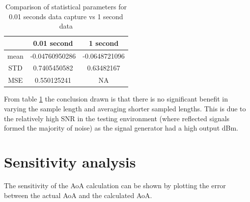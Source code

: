 \documentclass[class=report,11pt,crop=false]{standalone}
\begin{document}
\begin{table}[h]
    \centering
    \begin{tabular}{c|c|c}
         & \textbf{0.01 second } &\textbf{1 second} \\
         \hline
        mean & -0.04760950286 & -0.0648721096\\
        STD & 0.7405450582 & 0.63482167\\
        MSE & 0.550125241 & NA \\
    \end{tabular}
    \caption{Comparison of statistical parameters for 0.01 seconds data capture vs 1 second data}
    \label{tab:varied-length}
\end{table}

From table \ref{tab:varied-length} the conclusion drawn is that there is no significant benefit in varying the sample length and averaging shorter sampled lengths. This is due to the relatively high \gls{SNR} in the testing environment (where reflected signals formed the majority of noise) as the signal generator had a high output dBm. 
\section{Sensitivity analysis}
The sensitivity of the \gls{AoA} calculation can be shown by plotting the error between the actual \gls{AoA} and the calculated \gls{AoA}. 
\end{document}
